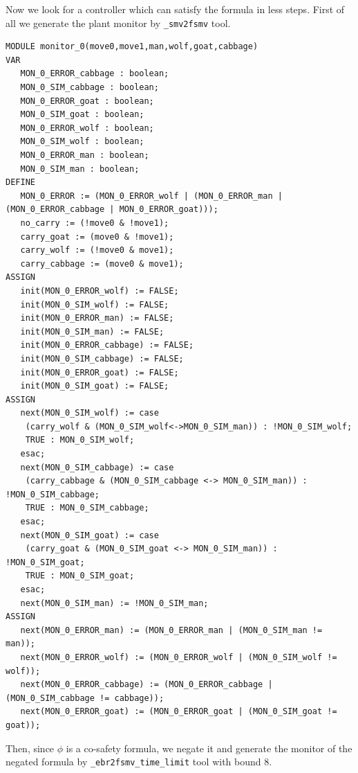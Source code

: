 Now we look for a controller which can satisfy the formula in less steps.
First of all we generate the plant monitor by \lstinline{_smv2fsmv} tool. 

\begin{lstlisting}[language=smv, caption=Ferryman ASAP: plant monitor]
MODULE monitor_0(move0,move1,man,wolf,goat,cabbage)
VAR
   MON_0_ERROR_cabbage : boolean;
   MON_0_SIM_cabbage : boolean;
   MON_0_ERROR_goat : boolean;
   MON_0_SIM_goat : boolean;
   MON_0_ERROR_wolf : boolean;
   MON_0_SIM_wolf : boolean;
   MON_0_ERROR_man : boolean;
   MON_0_SIM_man : boolean;
DEFINE
   MON_0_ERROR := (MON_0_ERROR_wolf | (MON_0_ERROR_man | (MON_0_ERROR_cabbage | MON_0_ERROR_goat)));
   no_carry := (!move0 & !move1);
   carry_goat := (move0 & !move1);
   carry_wolf := (!move0 & move1);
   carry_cabbage := (move0 & move1);
ASSIGN
   init(MON_0_ERROR_wolf) := FALSE;
   init(MON_0_SIM_wolf) := FALSE;
   init(MON_0_ERROR_man) := FALSE;
   init(MON_0_SIM_man) := FALSE;
   init(MON_0_ERROR_cabbage) := FALSE;
   init(MON_0_SIM_cabbage) := FALSE;
   init(MON_0_ERROR_goat) := FALSE;
   init(MON_0_SIM_goat) := FALSE;
ASSIGN
   next(MON_0_SIM_wolf) := case
    (carry_wolf & (MON_0_SIM_wolf<->MON_0_SIM_man)) : !MON_0_SIM_wolf;
    TRUE : MON_0_SIM_wolf;
   esac;
   next(MON_0_SIM_cabbage) := case
    (carry_cabbage & (MON_0_SIM_cabbage <-> MON_0_SIM_man)) : !MON_0_SIM_cabbage;
    TRUE : MON_0_SIM_cabbage;
   esac;
   next(MON_0_SIM_goat) := case
    (carry_goat & (MON_0_SIM_goat <-> MON_0_SIM_man)) : !MON_0_SIM_goat;
    TRUE : MON_0_SIM_goat;
   esac;
   next(MON_0_SIM_man) := !MON_0_SIM_man;
ASSIGN
   next(MON_0_ERROR_man) := (MON_0_ERROR_man | (MON_0_SIM_man != man));
   next(MON_0_ERROR_wolf) := (MON_0_ERROR_wolf | (MON_0_SIM_wolf != wolf));
   next(MON_0_ERROR_cabbage) := (MON_0_ERROR_cabbage | (MON_0_SIM_cabbage != cabbage));
   next(MON_0_ERROR_goat) := (MON_0_ERROR_goat | (MON_0_SIM_goat != goat));
\end{lstlisting}

Then, since $\phi$ is a co-safety formula, we negate it and generate the monitor of the negated formula by \lstinline{_ebr2fsmv_time_limit} tool with bound $8$.

